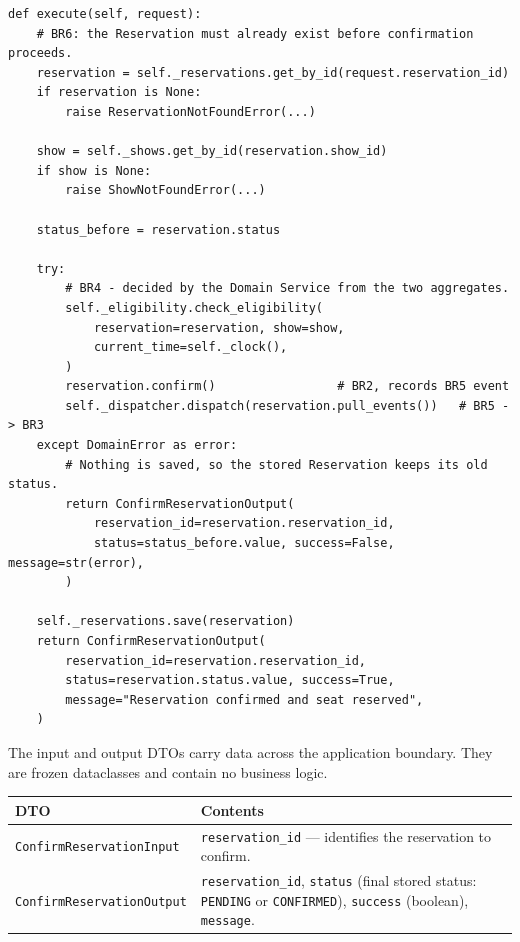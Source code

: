 \documentclass[11pt,a4paper]{article}
\newcommand{\code}[1]{\texttt{#1}}
\begin{document}
\begin{lstlisting}[style=python,caption={\code{ConfirmReservationService.execute()}\ --- use-case coordination with BR6 lookup.},label=lst:br6]
def execute(self, request):
    # BR6: the Reservation must already exist before confirmation proceeds.
    reservation = self._reservations.get_by_id(request.reservation_id)
    if reservation is None:
        raise ReservationNotFoundError(...)

    show = self._shows.get_by_id(reservation.show_id)
    if show is None:
        raise ShowNotFoundError(...)

    status_before = reservation.status

    try:
        # BR4 - decided by the Domain Service from the two aggregates.
        self._eligibility.check_eligibility(
            reservation=reservation, show=show,
            current_time=self._clock(),
        )
        reservation.confirm()                 # BR2, records BR5 event
        self._dispatcher.dispatch(reservation.pull_events())   # BR5 -> BR3
    except DomainError as error:
        # Nothing is saved, so the stored Reservation keeps its old status.
        return ConfirmReservationOutput(
            reservation_id=reservation.reservation_id,
            status=status_before.value, success=False, message=str(error),
        )

    self._reservations.save(reservation)
    return ConfirmReservationOutput(
        reservation_id=reservation.reservation_id,
        status=reservation.status.value, success=True,
        message="Reservation confirmed and seat reserved",
    )
\end{lstlisting}

The input and output DTOs carry data across the application boundary. They are
frozen dataclasses and contain no business logic.

\begin{center}
  \begin{tabularx}{\textwidth}{@{}l X@{}}
    \toprule
    \textbf{DTO} & \textbf{Contents} \\
    \midrule
    \code{ConfirmReservationInput} & \code{reservation\_id} --- identifies the
      reservation to confirm. \\
    \code{ConfirmReservationOutput} & \code{reservation\_id}, \code{status}
      (final stored status: \code{PENDING} or \code{CONFIRMED}), \code{success}
      (boolean), \code{message}. \\
    \bottomrule
  \end{tabularx}
\end{center}
\end{document}
